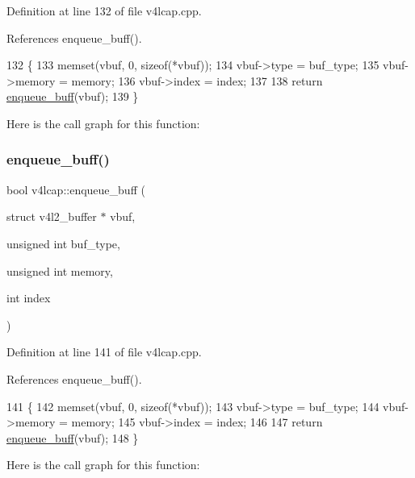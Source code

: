 Definition at line 132 of file v4lcap.\+cpp.



References enqueue\+\_\+buff().


\begin{DoxyCode}
132                                                                                                            
               \{
133     memset(vbuf, 0, \textcolor{keyword}{sizeof}(*vbuf));
134     vbuf->type = buf\_type;
135     vbuf->memory = memory;
136     vbuf->index = index;
137 
138     \textcolor{keywordflow}{return} \hyperlink{classv4lcap_a61dcacb5bb57a9f8c72d6942f46e9ddc}{enqueue\_buff}(vbuf);
139 \}
\end{DoxyCode}
Here is the call graph for this function\+:
\mbox{\label{classv4lcap_a8a93dd2fbae2c781d2dde65433198cff}} 
\subsubsection{\texorpdfstring{enqueue\+\_\+buff()}{enqueue\_buff()}\hspace{0.1cm}{\footnotesize\ttfamily [3/3]}}
{\footnotesize\ttfamily bool v4lcap\+::enqueue\+\_\+buff (\begin{DoxyParamCaption}\item[{struct v4l2\+\_\+buffer $\ast$}]{vbuf,  }\item[{unsigned int}]{buf\+\_\+type,  }\item[{unsigned int}]{memory,  }\item[{int}]{index }\end{DoxyParamCaption})}



Definition at line 141 of file v4lcap.\+cpp.



References enqueue\+\_\+buff().


\begin{DoxyCode}
141                                                                                                           \{
142     memset(vbuf, 0, \textcolor{keyword}{sizeof}(*vbuf));
143     vbuf->type = buf\_type;
144     vbuf->memory = memory;
145     vbuf->index = index;
146 
147     \textcolor{keywordflow}{return} \hyperlink{classv4lcap_a61dcacb5bb57a9f8c72d6942f46e9ddc}{enqueue\_buff}(vbuf);
148 \}
\end{DoxyCode}
Here is the call graph for this function\+:
\mbox{\label{classv4lcap_a717dc56b523519e90853137346b6f7f7}} 
